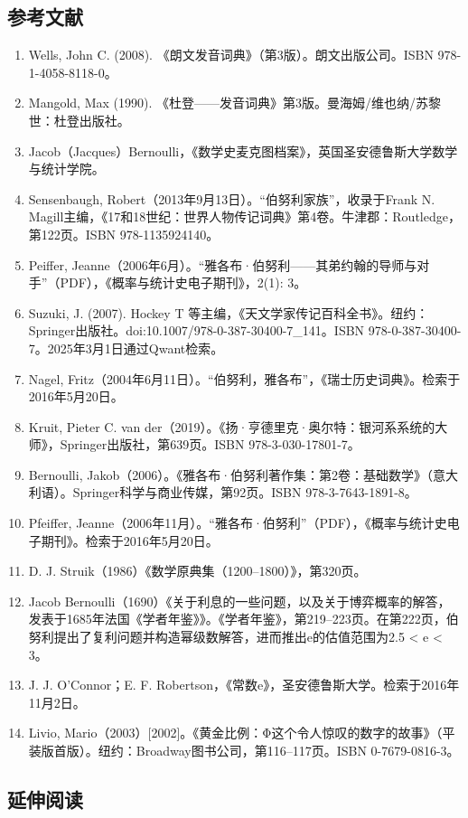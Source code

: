 \subsection{参考文献}
\begin{enumerate}
\item Wells, John C. (2008). 《朗文发音词典》（第3版）。朗文出版公司。ISBN 978-1-4058-8118-0。
\item Mangold, Max (1990). 《杜登——发音词典》第3版。曼海姆/维也纳/苏黎世：杜登出版社。
\item Jacob（Jacques）Bernoulli，《数学史麦克图档案》，英国圣安德鲁斯大学数学与统计学院。
\item Sensenbaugh, Robert（2013年9月13日）。“伯努利家族”，收录于Frank N. Magill主编，《17和18世纪：世界人物传记词典》第4卷。牛津郡：Routledge，第122页。ISBN 978-1135924140。
\item Peiffer, Jeanne（2006年6月）。“雅各布·伯努利——其弟约翰的导师与对手”（PDF），《概率与统计史电子期刊》，2(1): 3。
\item Suzuki, J. (2007). Hockey T 等主编，《天文学家传记百科全书》。纽约：Springer出版社。doi:10.1007/978-0-387-30400-7\_141。ISBN 978-0-387-30400-7。2025年3月1日通过Qwant检索。
\item Nagel, Fritz（2004年6月11日）。“伯努利，雅各布”，《瑞士历史词典》。检索于2016年5月20日。
\item Kruit, Pieter C. van der（2019）。《扬·亨德里克·奥尔特：银河系系统的大师》，Springer出版社，第639页。ISBN 978-3-030-17801-7。
\item Bernoulli, Jakob（2006）。《雅各布·伯努利著作集：第2卷：基础数学》（意大利语）。Springer科学与商业传媒，第92页。ISBN 978-3-7643-1891-8。
\item Pfeiffer, Jeanne（2006年11月）。“雅各布·伯努利”（PDF），《概率与统计史电子期刊》。检索于2016年5月20日。
\item D. J. Struik（1986）《数学原典集（1200–1800）》，第320页。
\item Jacob Bernoulli（1690）《关于利息的一些问题，以及关于博弈概率的解答，发表于1685年法国《学者年鉴》》。《学者年鉴》，第219–223页。在第222页，伯努利提出了复利问题并构造幂级数解答，进而推出e的估值范围为2.5 < e < 3。
\item J. J. O'Connor；E. F. Robertson，《常数e》，圣安德鲁斯大学。检索于2016年11月2日。
\item Livio, Mario（2003）[2002]。《黄金比例：Φ这个令人惊叹的数字的故事》（平装版首版）。纽约：Broadway图书公司，第116–117页。ISBN 0-7679-0816-3。
\end{enumerate}
\subsection{延伸阅读}

